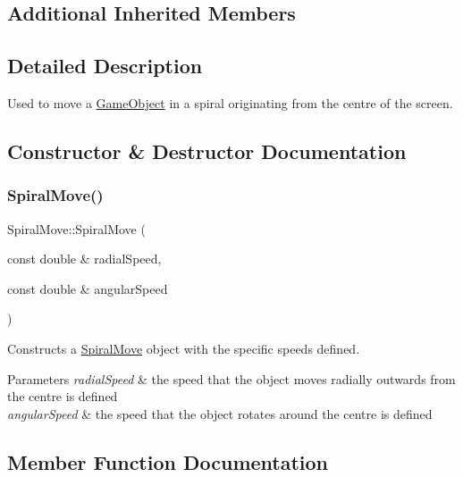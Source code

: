 \subsection*{Additional Inherited Members}


\subsection{Detailed Description}
Used to move a \hyperlink{class_game_object}{Game\+Object} in a spiral originating from the centre of the screen. 

\subsection{Constructor \& Destructor Documentation}
\mbox{\label{class_spiral_move_a60daaf7772f017481a253898ef4f3e6d}} 
\subsubsection{\texorpdfstring{Spiral\+Move()}{SpiralMove()}}
{\footnotesize\ttfamily Spiral\+Move\+::\+Spiral\+Move (\begin{DoxyParamCaption}\item[{const double \&}]{radial\+Speed,  }\item[{const double \&}]{angular\+Speed }\end{DoxyParamCaption})}



Constructs a \hyperlink{class_spiral_move}{Spiral\+Move} object with the specific speeds defined. 


\begin{DoxyParams}{Parameters}
{\em radial\+Speed} & the speed that the object moves radially outwards from the centre is defined \\
\hline
{\em angular\+Speed} & the speed that the object rotates around the centre is defined \\
\hline
\end{DoxyParams}


\subsection{Member Function Documentation}
\mbox{\label{class_spiral_move_a74b22995f5f3c00c623ecaa3adb2ab8e}} 
